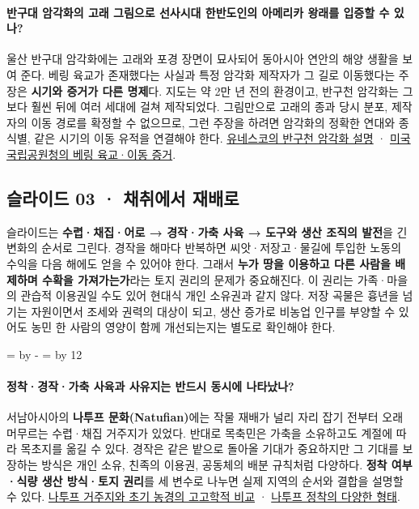 \documentclass[10pt,a4paper]{article}
\newcommand{\ReserveQuestionSpace}{%
  \par\begingroup
  \dimen0=\pagegoal \advance\dimen0 by -\pagetotal
  \dimen2=\baselineskip \multiply\dimen2 by 12
  \ifdim\dimen0<\dimen2 \newpage\fi
  \endgroup}
\begin{document}
\paragraph{반구대 암각화의 고래 그림으로 선사시대 한반도인의 아메리카 왕래를 입증할 수 있나?}
울산 반구대 암각화에는 고래와 포경 장면이 묘사되어 동아시아 연안의 해양 생활을 보여 준다. 베링 육교가 존재했다는 사실과 특정 암각화 제작자가 그 길로 이동했다는 주장은 \textbf{시기와 증거가 다른 명제}다. 지도는 약 2만 년 전의 환경이고, 반구천 암각화는 그보다 훨씬 뒤에 여러 세대에 걸쳐 제작되었다. 그림만으로 고래의 종과 당시 분포, 제작자의 이동 경로를 확정할 수 없으므로, 그런 주장을 하려면 암각화의 정확한 연대와 종 식별, 같은 시기의 이동 유적을 연결해야 한다. \href{https://whc.unesco.org/en/list/1740}{유네스코의 반구천 암각화 설명} · \href{https://www.nps.gov/articles/aps-17-1-2.htm}{미국 국립공원청의 베링 육교·이동 증거}.\par

\subsection{슬라이드 03 · 채취에서 재배로}
슬라이드는 \textbf{수렵·채집·어로 → 경작·가축 사육 → 도구와 생산 조직의 발전}을 긴 변화의 순서로 그린다. 경작을 해마다 반복하면 씨앗·저장고·물길에 투입한 노동의 수익을 다음 해에도 얻을 수 있어야 한다. 그래서 \textbf{누가 땅을 이용하고 다른 사람을 배제하며 수확을 가져가는가}라는 토지 권리의 문제가 중요해진다. 이 권리는 가족·마을의 관습적 이용권일 수도 있어 현대식 개인 소유권과 같지 않다. 저장 곡물은 흉년을 넘기는 자원이면서 조세와 권력의 대상이 되고, 생산 증가로 비농업 인구를 부양할 수 있어도 농민 한 사람의 영양이 함께 개선되는지는 별도로 확인해야 한다.\par

\ReserveQuestionSpace
\paragraph{정착·경작·가축 사육과 사유지는 반드시 동시에 나타났나?}
서남아시아의 \textbf{나투프 문화(Natufian)}에는 작물 재배가 널리 자리 잡기 전부터 오래 머무르는 수렵·채집 거주지가 있었다. 반대로 목축민은 가축을 소유하고도 계절에 따라 목초지를 옮길 수 있다. 경작은 같은 밭으로 돌아올 기대가 중요하지만 그 기대를 보장하는 방식은 개인 소유, 친족의 이용권, 공동체의 배분 규칙처럼 다양하다. \textbf{정착 여부·식량 생산 방식·토지 권리}를 세 변수로 나누면 실제 지역의 순서와 결합을 설명할 수 있다. \href{https://www.cambridge.org/core/services/aop-cambridge-core/content/view/99FBBE49F7498FF78006C24C9530156C/S0959774314001139a.pdf/pottery-invention-and-innovation-in-east-asia-and-the-near-east.pdf}{나투프 거주지와 초기 농경의 고고학적 비교} · \href{https://www.cambridge.org/core/journals/comparative-studies-in-society-and-history/article/reterritorializing-the-neolithic-architecture-and-rhythms-in-early-sedentary-societies-of-the-near-east/B6BAB6E4063BC82EDB8D03A3DE9B940E}{나투프 정착의 다양한 형태}.\par
\end{document}
